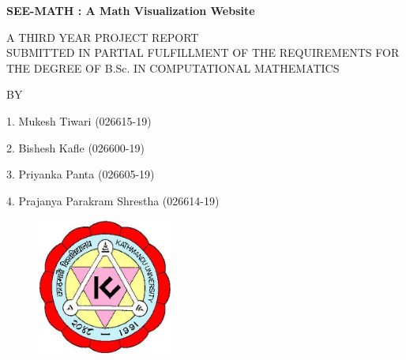 \documentclass[a4paper,12pt]{report}    %
\begin{document}



{\large
\begin{center}
{{\bf{\color{red}SEE-MATH : A Math Visualization Website}}}\\
\end{center}


\vspace{0.8cm}

{\normalsize
\begin{center}
A THIRD YEAR PROJECT REPORT\\

\vspace{0.5cm}
SUBMITTED IN PARTIAL FULFILLMENT OF THE REQUIREMENTS FOR\\
THE DEGREE OF B.Sc. IN COMPUTATIONAL MATHEMATICS\\

\vspace{1.0cm}

BY
\end{center}
\begin{center}
\begin{itemize}
\begin{center}

\item[1.] Mukesh Tiwari (026615-19)
\item[2.] Bishesh Kafle (026600-19)
\item[3.] Priyanka Panta (026605-19)
\item[4.] Prajanya Parakram Shrestha (026614-19)
\end{center}
\end{itemize}

\end{center}


\vspace{1.0cm}

\begin{figure}[htpb]
\centering
\includegraphics[height=4.5cm,width=4.5cm]{photos/kulogo.jpg}
\end{figure}


}}
\end{document}
